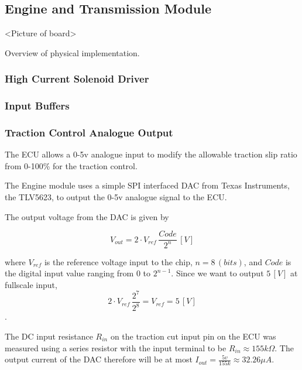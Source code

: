\subsection{Engine and Transmission Module}

<Picture of board>

Overview of physical implementation.


\subsubsection{High Current Solenoid Driver}


\subsubsection{Input Buffers}


\subsubsection{Traction Control Analogue Output}

The ECU allows a 0-5v analogue input to modify the allowable traction slip ratio from 0-100\% for the traction control.

The Engine module uses a simple SPI interfaced DAC from Texas Instruments, the TLV5623, to output the 0-5v analogue signal to the ECU.

The output voltage from the DAC is given by

\begin{equation}
V_{out}=2\cdot{V_{ref}}\,\frac{Code}{2^{n}}\,[V]
\end{equation}

where $V_{ref}$ is the reference voltage input to the chip, $n=8\,(bits)$, and $Code$ is the digital input value ranging from $0$ to $2^{n-1}$. Since we want to output $5\,[V]$ at fullscale input, \begin{equation} 2\cdot{V_{ref}}\,\frac{2^{7}}{2^{8}}=V_{ref}=5\,[V]\end{equation}.

The DC input resistance $R_{in}$ on the traction cut input pin on the ECU was measured using a series resistor with the input terminal to be $R_{in}\approx155k\Omega$. The output current of the DAC therefore will be at most $I_{out}=\frac{5v}{155k}\approx32.26\mu A$.